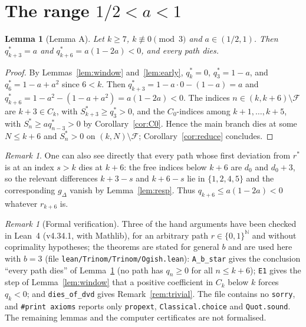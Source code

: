 \documentclass[11pt]{amsart}
\newtheorem{lemma}[theorem]{Lemma}
\theoremstyle{definition}
\theoremstyle{remark}
\newtheorem{remark}[theorem]{Remark}
\newcommand{\Cz}{C_0}
\newcommand{\Ck}{C_k}
\newcommand{\F}{\mathcal{F}}
\begin{document}
\section{The range \texorpdfstring{$1/2<a<1$}{1/2 < a < 1}}\label{sec:large}

\begin{lemma}[Lemma A]\label{lem:A}
Let $k\ge 7$, $k\not\equiv 0\pmod 3$ and $a\in(1/2,1)$. Then
$q^*_{k+3}=a$ and $q^*_{k+6}=a(1-2a)<0$, and every path dies.
\end{lemma}

\begin{proof}
By Lemmas~\ref{lem:window} and~\ref{lem:early}, $q^*_k=0$, $q^*_3=1-a$, and
$q^*_6=1-a+a^2$ since $6<k$. Then $q^*_{k+3}=1-a\cdot 0-(1-a)=a$ and
$q^*_{k+6}=1-a^2-(1-a+a^2)=a(1-2a)<0$. The indices $n\in(k,k+6)\setminus\F$ are
$k+3\in\Ck$, with $S^*_{k+3}\ge q^*_3>0$, and the $\Cz$-indices among
$k+1,\dots,k+5$, with $S^*_n\ge aq^*_{n-3}>0$ by Corollary~\ref{cor:C0}. Hence the
main branch dies at some $N\le k+6$ and $S^*_n>0$ on $(k,N)\setminus\F$;
Corollary~\ref{cor:reduce} concludes.
\end{proof}

\begin{remark}
One can also see directly that every path whose first deviation from $r^*$ is at
an index $s>k$ dies at $k+6$: the free indices below $k+6$ are $d_0$ and $d_0+3$,
so the relevant differences $k+3-s$ and $k+6-s$ lie in $\{1,2,4,5\}$ and the
corresponding $g_\Delta$ vanish by Lemma~\ref{lem:resp}. Thus $q_{k+6}\le a(1-2a)<0$
whatever $r_{k+6}$ is.
\end{remark}

\begin{remark}[Formal verification]\label{rem:lean}
Three of the hand arguments have been checked in Lean~4 (v4.34.1, with Mathlib),
for an arbitrary path $r\in\{0,1\}^{\mathbb{N}}$ and without coprimality
hypotheses; the theorems are stated for general $b$ and are used here with $b=3$
(file \texttt{lean/Trinom/Trinom/Ogish.lean}): \texttt{A\_b\_star} gives the
conclusion ``every path dies'' of Lemma~\ref{lem:A} (no path has $q_n\ge 0$ for all
$n\le k+6$); \texttt{E1} gives the step of Lemma~\ref{lem:window} that a positive
coefficient in $\Ck$ below $k$ forces $q_k<0$; and \texttt{dies\_of\_dvd} gives
Remark~\ref{rem:trivial}. The file contains no \texttt{sorry}, and
\texttt{\#print axioms} reports only \texttt{propext}, \texttt{Classical.choice} and
\texttt{Quot.sound}. The remaining lemmas and the computer certificates are not
formalised.
\end{remark}
\end{document}
